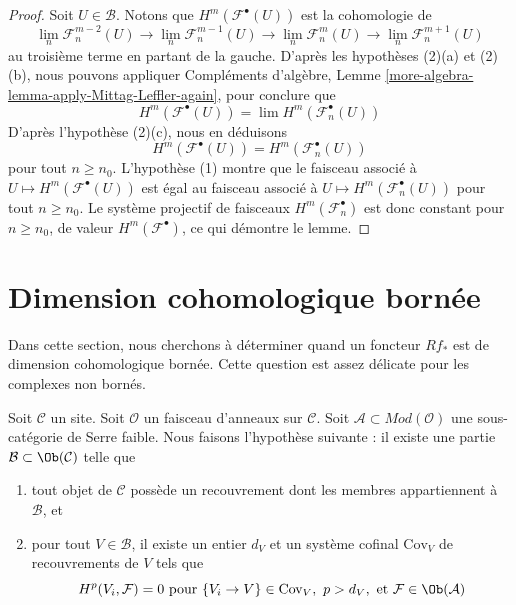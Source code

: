 \begin{proof}
Soit $U \in \mathcal{B}$. Notons que
$H^m(\mathcal{F}^\bullet(U))$ est la cohomologie de
$$
\lim_n \mathcal{F}_n^{m - 2}(U) \to
\lim_n \mathcal{F}_n^{m - 1}(U) \to
\lim_n \mathcal{F}_n^m(U) \to
\lim_n \mathcal{F}_n^{m + 1}(U)
$$
au troisième terme en partant de la gauche. D'après les hypothèses (2)(a)
et (2)(b), nous pouvons appliquer Compléments d'algèbre, Lemme
\ref{more-algebra-lemma-apply-Mittag-Leffler-again}, pour conclure que
$$
H^m(\mathcal{F}^\bullet(U)) = \lim H^m(\mathcal{F}_n^\bullet(U))
$$
D'après l'hypothèse (2)(c), nous en déduisons
$$
H^m(\mathcal{F}^\bullet(U)) = H^m(\mathcal{F}_n^\bullet(U))
$$
pour tout $n \geq n_0$. L'hypothèse (1) montre que le faisceau associé à
$U \mapsto H^m(\mathcal{F}^\bullet(U))$ est égal au faisceau associé à
$U \mapsto H^m(\mathcal{F}_n^\bullet(U))$ pour tout $n \geq n_0$. Le
système projectif de faisceaux $H^m(\mathcal{F}_n^\bullet)$ est donc
constant pour $n \geq n_0$, de valeur $H^m(\mathcal{F}^\bullet)$, ce qui
démontre le lemme.
\end{proof}







\section{Dimension cohomologique bornée}
\label{section-bounded}

\noindent
Dans cette section, nous cherchons à déterminer quand un foncteur $Rf_*$
est de dimension cohomologique bornée. Cette question est assez délicate
pour les complexes non bornés.

\begin{situation}
\label{situation-olsson-laszlo}
Soit $\mathcal{C}$ un site. Soit $\mathcal{O}$ un faisceau d'anneaux sur
$\mathcal{C}$. Soit $\mathcal{A} \subset \textit{Mod}(\mathcal{O})$ une
sous-catégorie de Serre faible. Nous faisons l'hypothèse suivante : il
existe une partie $\mathcal{B} \subset \Ob(\mathcal{C})$ telle que
\begin{enumerate}
\item tout objet de $\mathcal{C}$ possède un recouvrement dont les membres
appartiennent à $\mathcal{B}$, et
\item pour tout $V \in \mathcal{B}$, il existe un entier $d_V$ et un
système cofinal $\text{Cov}_V$ de recouvrements de $V$ tels que
$$
H^p(V_i, \mathcal{F}) = 0 \text{ pour }
\{V_i \to V\} \in \text{Cov}_V,\ p > d_V, \text{ et }
\mathcal{F} \in \Ob(\mathcal{A})
$$
\end{enumerate}
\end{situation}

